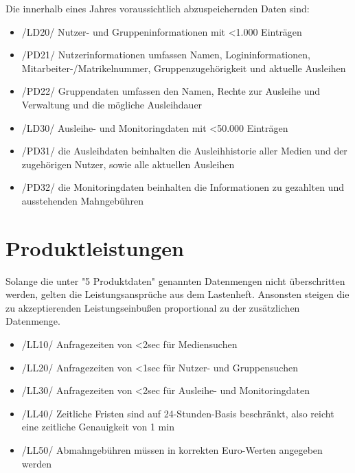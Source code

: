 \documentclass[12pt, a4paper]{article}
\begin{document}
Die innerhalb eines Jahres voraussichtlich abzuspeichernden Daten sind:
\begin{itemize}
	\item /LD20/ Nutzer- und Gruppeninformationen mit <1.000 Einträgen
	\item /PD21/ Nutzerinformationen umfassen Namen, Logininformationen, Mitarbeiter-/Matrikelnummer, Gruppenzugehörigkeit und aktuelle Ausleihen
	\item /PD22/ Gruppendaten umfassen den Namen, Rechte zur Ausleihe und Verwaltung und die mögliche Ausleihdauer
	\item /LD30/ Ausleihe- und Monitoringdaten mit <50.000 Einträgen
	\item /PD31/ die Ausleihdaten beinhalten die Ausleihhistorie aller Medien und der zugehörigen Nutzer, sowie alle aktuellen Ausleihen
	\item /PD32/ die Monitoringdaten beinhalten die Informationen zu gezahlten und ausstehenden Mahngebühren
\end{itemize}
\pagebreak

\section{Produktleistungen}
Solange die unter "5 Produktdaten" genannten Datenmengen nicht überschritten werden, gelten die Leistungsansprüche aus dem Lastenheft. Ansonsten steigen die zu akzeptierenden Leistungseinbußen proportional zu der zusätzlichen Datenmenge.
\begin{itemize}
	\item /LL10/ Anfragezeiten von <2sec für Mediensuchen
	\item /LL20/ Anfragezeiten von <1sec für Nutzer- und Gruppensuchen
	\item /LL30/ Anfragezeiten von <2sec für Ausleihe- und Monitoringdaten
	\item /LL40/ Zeitliche Fristen sind auf 24-Stunden-Basis beschränkt, also reicht eine zeitliche Genauigkeit von 1 min
	\item /LL50/ Abmahngebühren müssen in korrekten Euro-Werten angegeben werden
\end{itemize}
\pagebreak
\end{document}
